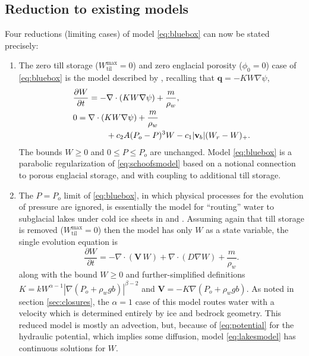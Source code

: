 \documentclass[gmd]{copernicus}   %
\newcommand{\text}{\textrm}
\newcommand\bv{\mathbf{v}}
\newcommand\bV{\mathbf{V}}
\newcommand\bq{\mathbf{q}}
\newcommand{\Div}{\nabla\cdot}
\newcommand{\grad}{\nabla}
\newcommand{\Wtilmax}{W_{\text{til}}^{\text{max}}}
\begin{document}
\subsection{Reduction to existing models}  Four reductions (limiting cases) of model \eqref{eq:bluebox} can now be stated precisely:

\renewcommand{\labelenumi}{\textbf{(\roman{enumi})}}
\begin{enumerate}
\item The zero till storage ($\Wtilmax=0$) and zero englacial porosity ($\phi_0=0$) case of \eqref{eq:bluebox} is the model described by \cite{Schoofetal2012}, recalling that $\bq = - K W \grad \psi$,
\begin{align}
&\frac{\partial W}{\partial t} = - \Div\left( K W \grad \psi \right) + \frac{m}{\rho_w}, \label{eq:schoofsmodel} \\
&0 = \Div \left( K W \grad \psi \right) + \frac{m}{\rho_w} \notag \\
&\qquad \qquad + c_2 A (P_o - P)^3 W - c_1 |\bv_b| (W_r - W)_+.  \notag
\end{align}
The bounds $W \ge 0$ and $0 \le P \le P_o$ are unchanged.  Model \eqref{eq:bluebox} is a parabolic regularization of \eqref{eq:schoofsmodel} based on a notional connection to porous englacial storage, and with coupling to additional till storage.

\item The $P=P_o$ limit of \eqref{eq:bluebox}, in which physical processes for the evolution of pressure are ignored, is essentially the model for ``routing'' water to subglacial lakes under cold ice sheets in \cite{Siegertetal2009} and \cite{Livingstoneetal2013}.  Assuming again that till storage is removed ($\Wtilmax=0$) then the model has only $W$ as a state variable, the single evolution equation is
\begin{equation}
\frac{\partial W}{\partial t} = - \Div\left(\bV\, W\right) + \Div \left(D \grad W\right) + \frac{m}{\rho_w}. \label{eq:lakesmodel}
\end{equation}
along with the bound $W \ge 0$ and further-simplified definitions $K = k W^{\alpha-1} \left|\grad (P_o + \rho_w g b)\right|^{\beta-2}$ and $\bV = - K \grad \left(P_o + \rho_w g b\right)$.  As noted in section \ref{sec:closures}, the $\alpha=1$ case of this model routes water with a velocity which is determined entirely by ice and bedrock geometry.  This reduced model is mostly an advection, but, because of \eqref{eq:potential} for the hydraulic potential, which implies some diffusion, model \eqref{eq:lakesmodel} has continuous solutions for $W$.


\end{enumerate}
\end{document}
